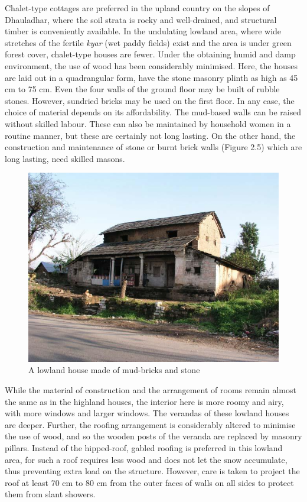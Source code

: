 Chalet-type cottages are preferred in the upland country on the slopes of Dhauladhar, where the soil strata is rocky and well-drained, and structural timber is conveniently available. In the undulating lowland area, where wide stretches of the fertile \textit{kyar} (wet paddy fields) exist and the area is under green forest cover, chalet-type houses are fewer. Under the obtaining humid and damp environment, the use of wood has been considerably minimised. Here, the houses are laid out in a quadrangular form, have the stone masonry plinth as high as 45 cm to 75 cm. Even the four walls of the ground floor may be built of rubble stones. However, sundried bricks may be used on the first floor. In any case, the choice of material depends on its affordability. The mud-based walls can be raised without skilled labour. These can also be maintained by household women in a routine manner, but these are certainly not long lasting. On the other hand, the construction and maintenance of stone or burnt brick walls (Figure 2.5) which are long lasting, need skilled masons.

\begin{figure}[!htbp]
\includegraphics[scale=.35]{images/chap02-05.jpg}
\caption{A lowland house made of mud-bricks and stone}\label{chap02-fig05}
\end{figure}

\newpage

While the material of construction and the arrangement of rooms remain almost the same as in the highland houses, the interior here is more roomy and airy, with more windows and larger windows. The verandas of these lowland houses are deeper. Further, the roofing arrangement is considerably altered to minimise the use of wood, and so the wooden posts of the veranda are replaced by masonry pillars. Instead of the hipped-roof, gabled roofing is preferred in this lowland area, for such a roof requires less wood and does not let the snow accumulate, thus preventing extra load on the structure. However, care is taken to project the roof at least 70 cm to 80 cm from the outer faces of walls on all sides to protect them from slant showers.

